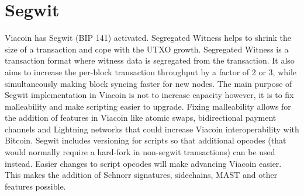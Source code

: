 \documentclass{article}
\begin{document}
\section{Segwit}\label{sec: Segwit}
Viacoin has \cite{segwit}Segwit (BIP 141) activated. Segregated Witness helps to shrink the size of a transaction and cope with the UTXO growth.
Segregated Witness is a transaction format where witness data is segregated from the transaction. It also
aims to increase the per-block transaction throughput by a factor of 2 or 3, while
simultaneously making block syncing faster for new nodes.
\newline \newline \noindent
The main purpose of Segwit implementation in Viacoin is not to increase capacity however, it is to fix malleability and
make scripting easier to upgrade. Fixing malleability allows for the addition of features in Viacoin like \cite{atomic}atomic swaps, bidirectional payment channels and
Lightning networks that could increase Viacoin interoperability with Bitcoin.
\newline \newline \noindent
Segwit includes versioning for scripts so that additional opcodes (that would normally require
a hard-fork in non-segwit transactions) can be used instead. Easier changes to script opcodes will make advancing
Viacoin easier. This makes the addition of Schnorr signatures, sidechains, MAST and other features possible.
\end{document}
